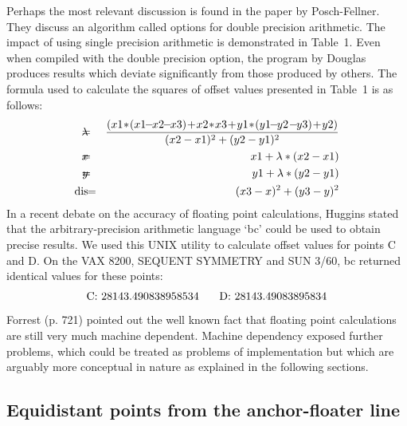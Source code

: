 \documentclass{egpubl}
\let\rm=\rmfamily    \let\sf=\sffamily    \let\tt=\ttfamily
\begin{document}
Perhaps the most relevant discussion is found in the paper by
Posch-Fellner.\cite{PosFel89}
They discuss an algorithm called options for double precision arithmetic. The
impact of using single precision arithmetic is demonstrated in Table~1. Even
when compiled with the double precision option, the program by Douglas
produces results which deviate significantly from those produced by others.
The formula used to calculate the squares of offset values presented in
Table~1 is as follows:
%
%
\begin{eqnarray*}
 \lambda\! &\!\!\!\! =\!\!\!\! & \frac{(x1\!*\!(x1\!\!-\!\!x2\!\!-\!\!x3)%
                                       \!+\!x2\!*\!x3\!+\!y1\!*\!%
                         (y1\!\!-\!\!y2\!-\!\!y3)\!+\!y2)}%
                    {(x2-x1)^2+(y2-y1)^2}\\
       x\! &\!\!\!\! =\!\!\!\! & x1+\lambda *(x2-x1)\\
       y\! &\!\!\!\! =\!\!\!\! & y1+\lambda *(y2-y1)\\
 \mbox{\rm dis}\! &\! =\! & (x3-x)^2+(y3-y)^2
\end{eqnarray*}
%
In a recent debate on the accuracy of floating point calculations, Huggins
stated that the arbitrary-precision arithmetic language `bc' could be used to
obtain precise results. We used this UNIX utility to calculate offset values
for points C and D. On the VAX 8200, SEQUENT SYMMETRY and SUN 3/60, bc
returned identical values for these points:
%
%
\[\mbox{
C: 28143.490838958534 \hskip 15pt
D: 28143.49083895834
}\]
%
Forrest (p. 721) pointed out the well known fact that floating point
calculations are still very much machine dependent. Machine dependency
exposed further problems, which could be treated as problems of
implementation but which are arguably more conceptual in nature as explained
in the following sections.

\subsection{Equidistant points from the anchor-floater line}
\end{document}
